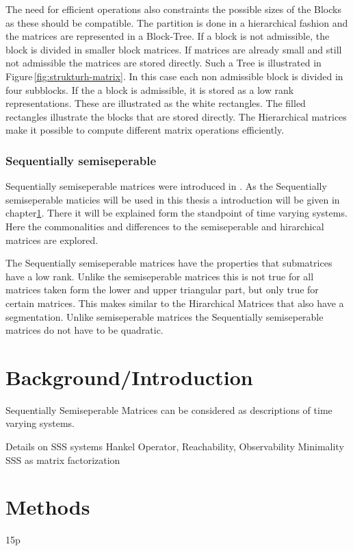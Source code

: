 \documentclass[doctype=mastersthesis,BCOR=15mm,biblatex]{ldvbook}%
\begin{document}
The need for efficient operations also constraints the possible sizes of the Blocks as these should be compatible.
The partition is done in a hierarchical fashion and the matrices are represented in a Block-Tree. 
If a block is not admissible, the block is divided in smaller block matrices.
If matrices are already small and still not admissible the matrices are stored directly.
Such a Tree is illustrated in Figure\,\ref*{fig:strukturh-matrix}.
In this case each non admissible block is divided in four subblocks. 
If the a block is admissible, it is stored as a low rank representations.
These are illustrated as the white rectangles.
The filled rectangles illustrate the blocks that are stored directly.
The Hierarchical matrices make it possible to compute different matrix operations efficiently.


\subsection{Sequentially semiseperable}
Sequentially semiseperable matrices were introduced in \cite{dewilde_time-varying_1998}.
As the Sequentially semiseperable maticies will be used in this thesis a introduction will be given in chapter\ref{chap:background}. 
There it will be explained form the standpoint of time varying systems.
Here the commonalities and differences to the semiseperable and hirarchical matrices are explored.

The Sequentially semiseperable matrices have the properties that submatrices have a low rank.
Unlike the semiseperable matrices this is not true for all matrices taken form the lower and upper triangular part, but only true for certain matrices.
This makes similar to the Hirarchical Matrices that also have a segmentation.
Unlike semiseperable matrices the Sequentially semiseperable matrices do not have to be quadratic. 

\chapter{Background/Introduction}\label{chap:background}

Sequentially Semiseperable Matrices can be considered as descriptions of time varying systems.

Details on SSS systems
Hankel Operator, Reachability, Observability
Minimality
SSS as matrix factorization


\chapter{Methods} 15p
\end{document}
